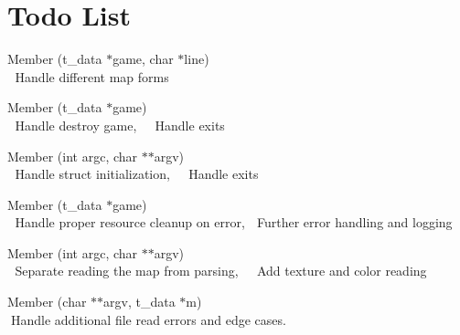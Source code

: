 \chapter{Todo List}
\hypertarget{todo}{}\label{todo}

\begin{DoxyRefList}
\item[Member \doxylink{read__map_8c_a804cd515bd4c1bf7169adeb352db80fb}{add\+\_\+line} (t\+\_\+data \texorpdfstring{$\ast$}{*}game, char \texorpdfstring{$\ast$}{*}line)]\hfill \\
\label{todo__todo000004}%
%
👾 Handle different map forms  
\item[Member \doxylink{cub3d_8c_a935bbae1ea2cb5d18534db1274ec24dd}{exit\+\_\+point} (t\+\_\+data \texorpdfstring{$\ast$}{*}game)]\hfill \\
\label{todo__todo000001}%
%
👾 Handle destroy game,~\newline
 👾 Handle exits  
\item[Member \doxylink{cub3d_8c_a3c04138a5bfe5d72780bb7e82a18e627}{main} (int argc, char \texorpdfstring{$\ast$}{*}\texorpdfstring{$\ast$}{*}argv)]\hfill \\
\label{todo__todo000002}%
%
👾 Handle struct initialization,~\newline
 👾 Handle exits  
\item[Member \doxylink{mlx__init__create__win_8c_a81e5bd795cb879b651de99812ac575da}{mlx\+\_\+init\+\_\+create\+\_\+window} (t\+\_\+data \texorpdfstring{$\ast$}{*}game)]\hfill \\
\label{todo__todo000006}%
%
👾 Handle proper resource cleanup on error, 👾 Further error handling and logging  
\item[Member \doxylink{parsing_8c_a5a92095eb57b614020d1000c4cdc92d5}{parsing} (int argc, char \texorpdfstring{$\ast$}{*}\texorpdfstring{$\ast$}{*}argv)]\hfill \\
\label{todo__todo000003}%
%
👾 Separate reading the map from parsing,~\newline
 👾 Add texture and color reading


\item[Member \doxylink{read__map_8c_abc6a0e39f4097410a6462b03e8b98fe5}{read\+\_\+map} (char \texorpdfstring{$\ast$}{*}\texorpdfstring{$\ast$}{*}argv, t\+\_\+data \texorpdfstring{$\ast$}{*}m)]\hfill \\
\label{todo__todo000005}%
%
👾\+Handle additional file read errors and edge cases. 
\end{DoxyRefList}